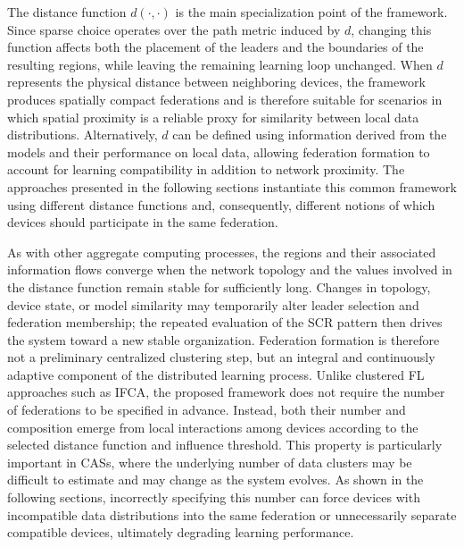 The distance function \(d(\cdot,\cdot)\) is the main specialization point of
the framework.
%
Since sparse choice operates over the path metric induced by \(d\), changing
this function affects both the placement of the leaders and the boundaries of
the resulting regions, while leaving the remaining learning loop unchanged.
%
When \(d\) represents the physical distance between neighboring devices, the
framework produces spatially compact federations and is therefore suitable for
scenarios in which spatial proximity is a reliable proxy for similarity between
local data distributions.
%
Alternatively, \(d\) can be defined using information derived from the models
and their performance on local data, allowing federation formation to account
for learning compatibility in addition to network proximity.
%
The approaches presented in the following sections instantiate this common
framework using different distance functions and, consequently, different
notions of which devices should participate in the same federation.

As with other aggregate computing processes, the regions and their associated
information flows converge when the network topology and the values involved in
the distance function remain stable for sufficiently long.
%
Changes in topology, device state, or model similarity may temporarily alter
leader selection and federation membership; the repeated evaluation of the
\gls{SCR} pattern then drives the system toward a new stable organization.
%
Federation formation is therefore not a preliminary centralized clustering
step, but an integral and continuously adaptive component of the distributed
learning process.
%
Unlike clustered \gls{FL} approaches such as IFCA, the proposed framework
does not require the number of federations to be specified in advance.
%
Instead, both their number and composition emerge from local interactions among
devices according to the selected distance function and influence threshold.
%
This property is particularly important in \glspl{CAS}, where the underlying
number of data clusters may be difficult to estimate and may change as the
system evolves.
%
As shown in the following sections, incorrectly specifying this number can force
devices with incompatible data distributions into the same federation or
unnecessarily separate compatible devices, ultimately degrading learning
performance.



